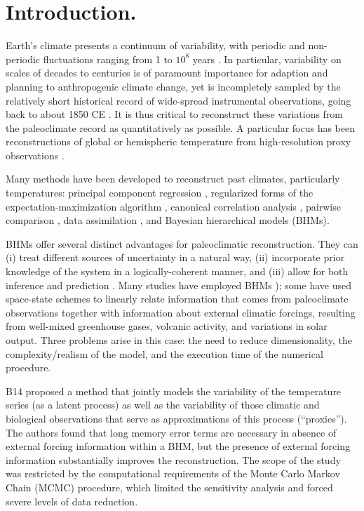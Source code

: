 \documentclass[12pt]{amsart}
\theoremstyle{plain}
\theoremstyle{definition}
\theoremstyle{remark}
\begin{document}
\section{Introduction.}
\label{sec:intro}

Earth's climate presents a continuum of variability, with periodic and non-periodic fluctuations ranging from 1 to $10^8$ years \citep{pelletier_power_1998}. In particular, variability on scales of decades to centuries is of paramount importance for adaption and planning to anthropogenic climate change, yet is incompletely sampled by the relatively short historical record of wide-spread instrumental observations, going back to about 1850 CE \citep{AR5_chap5}. It is thus critical to reconstruct these variations from the paleoclimate record as quantitatively as possible.  A particular focus has been reconstructions of global or hemispheric temperature from high-resolution proxy observations \citep{Jones_Holocene09}.

Many methods have been developed to reconstruct past climates, particularly temperatures:  principal component regression
\citep{MBH98,luterbacher2004european}, regularized forms of the expectation-maximization algorithm \citep{Schneider2001,mann2007robust,JEG10a,Guillot_AOAS2015}, canonical
correlation analysis \citep{smerdon2010pseudoproxy,Wang_CP2014}, pairwise comparison
\citep{Hanhijarvi2013}, data assimilation \citep{Lee_CD08,Hakim2016}, and Bayesian hierarchical models (BHMs). 

BHMs offer several distinct advantages for paleoclimatic reconstruction. They can (i) treat different sources of uncertainty in a natural way, (ii) incorporate prior knowledge of the system in a logically-coherent manner, and (iii) allow for both inference and prediction \citep{Tingley_QSR2012}. 
Many studies have employed BHMs \citep[e.g.][hereafter, "B14"]{boli1, tingley2013_Ext,Barboza2014}); some have used space-state
schemes to linearly relate information that comes from paleoclimate observations together with information about external climatic forcings, resulting from 
well-mixed greenhouse gases, volcanic activity, and variations in solar output. Three problems arise in this
case: the need to reduce dimensionality, the complexity/realism of the model, and the execution time of the numerical procedure. 

B14 proposed a method that jointly models the variability of the
temperature series (as a latent process) as well as the variability of those
climatic and biological observations that serve as approximations of this process (``proxies'').
The authors found that long memory error terms are necessary in absence of
external forcing information within a BHM, but the
presence of external forcing information substantially improves the reconstruction. The scope of the study was restricted by the computational requirements of the Monte Carlo Markov Chain (MCMC) procedure, which limited the sensitivity analysis and forced severe levels of data reduction. 
\end{document}
